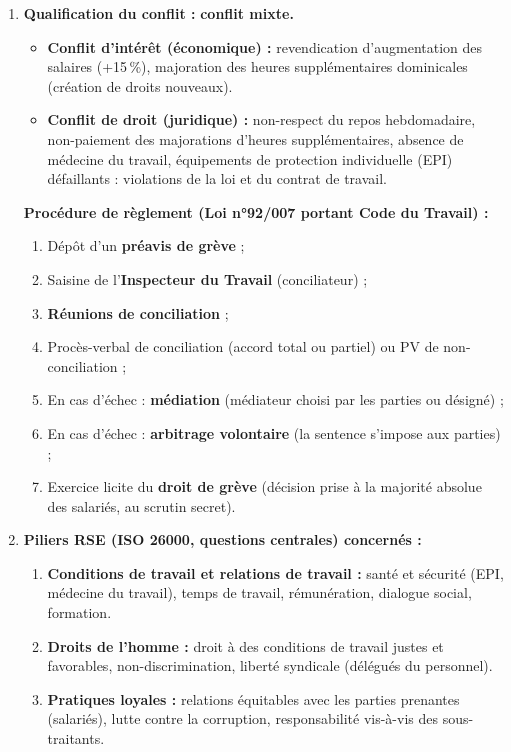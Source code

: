\documentclass[11pt]{article}
\begin{document}
\begin{corrige}
\begin{enumerate}
    \item \textbf{Qualification du conflit :} \textbf{conflit mixte.}
    \begin{itemize}
        \item \textbf{Conflit d'intérêt (économique) :} revendication d'augmentation des salaires (+15\,\%), majoration des heures supplémentaires dominicales (création de droits nouveaux).
        \item \textbf{Conflit de droit (juridique) :} non-respect du repos hebdomadaire, non-paiement des majorations d'heures supplémentaires, absence de médecine du travail, équipements de protection individuelle (EPI) défaillants : violations de la loi et du contrat de travail.
    \end{itemize}
    \textbf{Procédure de règlement (Loi n°92/007 portant Code du Travail) :}
    \begin{enumerate}
        \item Dépôt d'un \textbf{préavis de grève} ;
        \item Saisine de l'\textbf{Inspecteur du Travail} (conciliateur) ;
        \item \textbf{Réunions de conciliation} ;
        \item Procès-verbal de conciliation (accord total ou partiel) ou PV de non-conciliation ;
        \item En cas d'échec : \textbf{médiation} (médiateur choisi par les parties ou désigné) ;
        \item En cas d'échec : \textbf{arbitrage volontaire} (la sentence s'impose aux parties) ;
        \item Exercice licite du \textbf{droit de grève} (décision prise à la majorité absolue des salariés, au scrutin secret).
    \end{enumerate}

    \item \textbf{Piliers RSE (ISO 26000, questions centrales) concernés :}
    \begin{enumerate}
        \item \textbf{Conditions de travail et relations de travail :} santé et sécurité (EPI, médecine du travail), temps de travail, rémunération, dialogue social, formation.
        \item \textbf{Droits de l'homme :} droit à des conditions de travail justes et favorables, non-discrimination, liberté syndicale (délégués du personnel).
        \item \textbf{Pratiques loyales :} relations équitables avec les parties prenantes (salariés), lutte contre la corruption, responsabilité vis-à-vis des sous-traitants.
    \end{enumerate}


\end{enumerate}
\end{corrige}
\end{document}
